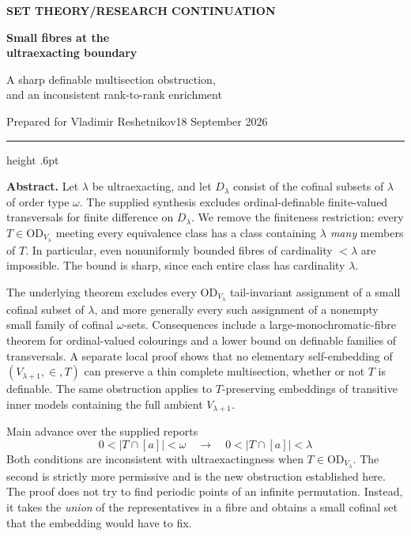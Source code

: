 \documentclass[11pt,letterpaper]{article}
\theoremstyle{definition}
\numberwithin{equation}{section}
\newcommand{\OD}{\mathrm{OD}}
\begin{document}
\thispagestyle{empty}
{\sffamily\bfseries\small\color{Olive}SET THEORY\quad /\quad RESEARCH CONTINUATION}

\vspace{13pt}
{\fontsize{28}{31}\selectfont\bfseries\color{Forest}Small fibres at the\\ ultraexacting boundary\par}
\vspace{10pt}
{\fontsize{14}{18}\selectfont A sharp definable multisection obstruction,\\ and an inconsistent rank-to-rank enrichment\par}
\vspace{14pt}
{\color{Muted}Prepared for Vladimir Reshetnikov\hfill 18 September 2026\par}
\vspace{3pt}
{\color{Sage}\hrule height .6pt}
\vspace{12pt}

\textbf{Abstract.}
Let $\lambda$ be ultraexacting, and let $D_\lambda$ consist of the cofinal subsets of $\lambda$ of order type $\omega$. The supplied synthesis excludes ordinal-definable finite-valued transversals for finite difference on $D_\lambda$. We remove the finiteness restriction: every $T\in\OD_{V_\lambda}$ meeting every equivalence class has a class containing \emph{$\lambda$ many} members of $T$. In particular, even nonuniformly bounded fibres of cardinality $<\lambda$ are impossible. The bound is sharp, since each entire class has cardinality $\lambda$.

The underlying theorem excludes every $\OD_{V_\lambda}$ tail-invariant assignment of a small cofinal subset of $\lambda$, and more generally every such assignment of a nonempty small family of cofinal $\omega$-sets. Consequences include a large-monochromatic-fibre theorem for ordinal-valued colourings and a lower bound on definable families of transversals. A separate local proof shows that no elementary self-embedding of $(V_{\lambda+1},\in,T)$ can preserve a thin complete multisection, whether or not $T$ is definable. The same obstruction applies to $T$-preserving embeddings of transitive inner models containing the full ambient $V_{\lambda+1}$.

\begin{assessment}{Main advance over the supplied reports}
\[
\boxed{\quad 0<|T\cap[a]|<\omega\quad\longrightarrow\quad
                 0<|T\cap[a]|<\lambda\quad}
\]
Both conditions are inconsistent with ultraexactingness when $T\in\OD_{V_\lambda}$. The second is strictly more permissive and is the new obstruction established here. The proof does not try to find periodic points of an infinite permutation. Instead, it takes the \emph{union} of the representatives in a fibre and obtains a small cofinal set that the embedding would have to fix.
\end{assessment}
\end{document}
